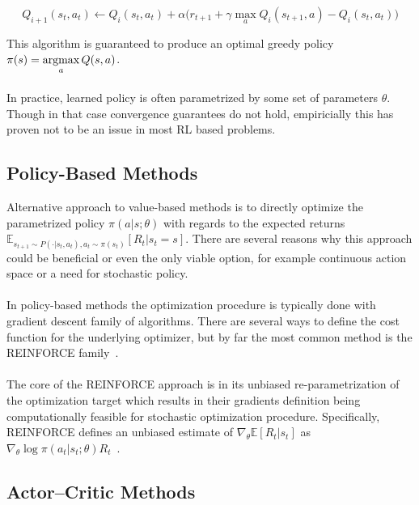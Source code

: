 $$Q_{i+1}(s_t, a_t) \leftarrow Q_{i}(s_t,a_t) + \alpha\big(r_{t+1} +  \gamma \max\limits_{a}Q_{i}(s_{t+1}, a) - Q_{i}(s_t, a_t)\big)$$

\noindent This algorithm is guaranteed to produce an optimal greedy policy $\pi(s) = \argmax\limits_a Q(s,a)$.
\\\\
In practice, learned policy is often parametrized by some set of parameters $\theta$. Though in that case convergence guarantees do not hold, empiricially this has proven not to be an issue in most RL based problems.

\subsection{Policy-Based Methods} \label{pbm}

Alternative approach to value-based methods is to directly optimize the parametrized policy $\pi(a|s;\theta)$ with regards to the expected returns $\mathbb{E}_{s_{t+1} \sim P(\cdot|s_t,a_t), a_t \sim \pi(s_t)}[R_t|s_t = s]$. There are several reasons why this approach could be beneficial or even the only viable option, for example continuous action space or a need for stochastic policy.
\\\\
In policy-based methods the optimization procedure is typically done with gradient descent family of algorithms. There are several ways to define the cost function for the underlying optimizer, but by far the most common method is the REINFORCE family~\cite{Williams1992}.
\\\\
The core of the REINFORCE approach is in its unbiased re-parametrization of the optimization target which results in their gradients definition being computationally feasible for stochastic optimization procedure. Specifically, REINFORCE defines an unbiased estimate of $\nabla_{\theta} \mathbb{E}[R_t|s_t]$ as $\nabla_{\theta} \log \pi(a_t|s_t;\theta)R_t$~\cite{Williams1992}.

\subsection{Actor--Critic Methods}

